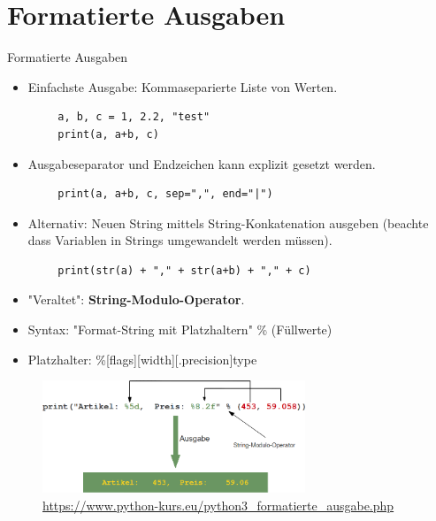 \documentclass[utf8, smaller, c]{beamer}
\begin{document}
\section{Formatierte Ausgaben}
\begin{frame}{Formatierte Ausgaben}
	\begin{itemize}
		\item Einfachste Ausgabe: Kommaseparierte Liste von Werten.
	\end{itemize}
	\begin{lstlisting}
		a, b, c = 1, 2.2, "test"
		print(a, a+b, c)
	\end{lstlisting}
	\begin{itemize}
		\item Ausgabeseparator und Endzeichen kann explizit gesetzt werden.
	\end{itemize}
	\begin{lstlisting}
		print(a, a+b, c, sep=",", end="|")
	\end{lstlisting}
	\begin{itemize}
		\item Alternativ: Neuen String mittels String-Konkatenation ausgeben (beachte dass Variablen in Strings umgewandelt werden müssen).
	\end{itemize}
	\begin{lstlisting}
		print(str(a) + "," + str(a+b) + "," + c)
	\end{lstlisting}
	
	\pagebreak
	
	\vspace*{-2mm}
	\begin{itemize}
		\item "Veraltet": \textbf{String-Modulo-Operator}.
		\item Syntax: "Format-String mit Platzhaltern" \% (Füllwerte)
		\item Platzhalter: \%[flags][width][.precision]type
	\end{itemize}
	\begin{figure}[hb]
		\centering
		\includegraphics[width=0.7\textwidth]{pics/formatierte_ausgabe1.png}
		{\tiny\url{https://www.python-kurs.eu/python3_formatierte_ausgabe.php}}
	\end{figure}
	

\end{frame}
\end{document}
